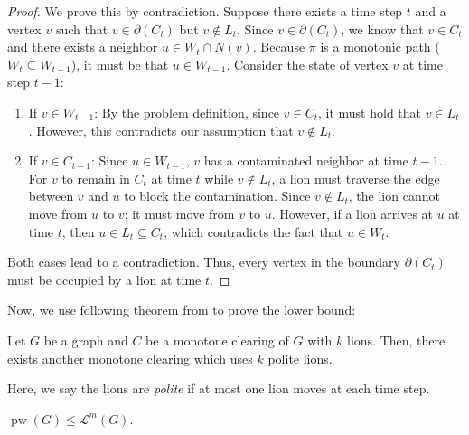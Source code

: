 \documentclass[a4paper,UKenglish,cleveref, autoref, thm-restate]{lipics-v2021}
\begin{document}
\begin{proof}
We prove this by contradiction. Suppose there exists a time step $t$ and a vertex $v$ such that $v \in \partial(C_t)$ but $v \notin L_t$.
Since $v \in \partial(C_t)$, we know that $v \in C_t$ and there exists a neighbor $u \in W_t \cap N(v)$. Because $\pi$ is a monotonic path ($W_t \subseteq W_{t-1}$), it must be that $u \in W_{t-1}$.
Consider the state of vertex $v$ at time step $t-1$:

\begin{enumerate}
    \item If $v \in W_{t-1}$: By the problem definition, since $v\in C_t$, it must hold that $v\in L_t$. However, this contradicts our assumption that $v \notin L_t$.
    \item If $v \in C_{t-1}$: Since $u \in W_{t-1}$, $v$ has a contaminated neighbor at time $t-1$. For $v$ to remain in $C_t$ at time $t$ while $v\notin L_t$, a lion must traverse the edge between $v$ and $u$ to block the contamination. Since $v \notin L_t$, the lion cannot move from $u$ to $v$; it must move from $v$ to $u$. However, if a lion arrives at $u$ at time $t$, then $u \in L_t \subseteq C_t$, which contradicts the fact that $u \in W_t$.
\end{enumerate}

Both cases lead to a contradiction. Thus, every vertex in the boundary $\partial(C_t)$ must be occupied by a lion at time $t$.
\end{proof}

Now, we use following theorem from \cite{Bertschinger23} to prove the lower bound:
\begin{theorem} \label{theorem:monotonous_polite_theorem}
Let $G$ be a graph and $C$ be a monotone clearing of $G$ with $k$ lions. Then, there exists another monotone clearing which uses $k$ polite lions.
\end{theorem}
Here, we say the lions are \emph{polite} if at most one lion moves at each time step.

\begin{theorem}\label{theorem:monotonous_lower_bound_on_general_graph_theorem}
$\operatorname{pw}(G) \leq \mathcal{L}^m(G)$.
\end{theorem}
\end{document}
